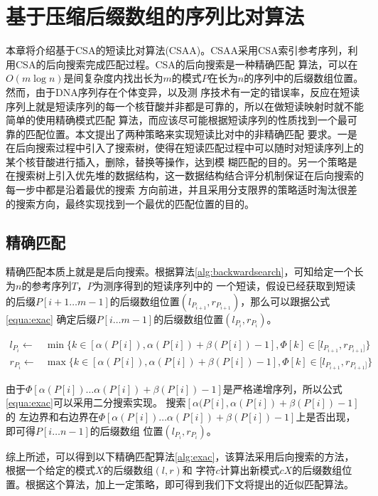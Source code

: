 \chapter{基于压缩后缀数组的序列比对算法}
本章将介绍基于CSA的短读比对算法(CSAA)。CSAA采用CSA索引参考序列，利用CSA的后向搜索完成匹配过程。CSA的后向搜索是一种精确匹配
算法，可以在$O(m\log n)$是间复杂度内找出长为$m$的模式$P$在长为$n$的序列中的后缀数组位置。然而，由于DNA序列存在个体变异，以及测
序技术有一定的错误率，反应在短读序列上就是短读序列的每一个核苷酸并非都是可靠的，所以在做短读映射时就不能简单的使用精确模式匹配
算法，而应该尽可能根据短读序列的性质找到一个最可靠的匹配位置。本文提出了两种策略来实现短读比对中的非精确匹配
要求。一是在后向搜索过程中引入了搜索树，使得在短读匹配过程中可以随时对短读序列上的某个核苷酸进行插入，删除，替换等操作，达到模
糊匹配的目的。另一个策略是在搜索树上引入优先堆的数据结构，这一数据结构结合评分机制保证在后向搜索的每一步中都是沿着最优的搜索
方向前进，并且采用分支限界的策略适时淘汰很差的搜索方向，最终实现找到一个最优的匹配位置的目的。

\section{精确匹配}
精确匹配本质上就是是后向搜索。根据算法\ref{alg:backwardsearch}，可知给定一个长为$n$的参考序列$T$，$P$为测序得到的短读序列中的
一个短读，假设已经获取到短读的后缀$P[i+1\ldots m-1]$的后缀数组位置$(l_{P_{i+1}},r_{P_{i+1}})$，那么可以跟据公式\ref{equa:exac}
确定后缀$P[i\ldots m-1]$的后缀数组位置$(l_{P_i},r_{P_i})$。

\begin{equation}\label{equa:exac}
    \begin{split}
        l_{P_i} \gets &\min\{ k \in [\alpha(P[i]),\alpha(P[i])+\beta(P[i])-1],\Phi[k] \in [l_{P_{i+1}},r_{P_{i+1}]}\}\\
        r_{P_i} \gets &\max\{ k \in [\alpha(P[i]),\alpha(P[i])+\beta(P[i])-1],\Phi[k] \in [l_{P_{i+1}},r_{P_{i+1}]}\}
    \end{split}
\end{equation}

由于$\Phi[\alpha(P[i])\ldots \alpha(P[i])+\beta(P[i])-1]$是严格递增序列，所以公式\ref{equa:exac}可以采用二分搜索实现。
搜索$[\alpha(P[i],\alpha(P[i])+\beta(P[i])-1]$的
左边界和右边界在$\Phi[\alpha(P[i])\ldots \alpha(P[i])+\beta(P[i])-1]$上是否出现，即可得$P[i\ldots n-1]$的后缀数组
位置$(l_{P_i},r_{P_i})$。

综上所述，可以得到以下精确匹配算法\ref{alg:exac}，该算法采用后向搜索的方法，根据一个给定的模式$X$的后缀数组$(l,r)$和
字符$c$计算出新模式$cX$的后缀数组位置。根据这个算法，加上一定策略，即可得到我们下文将提出的近似匹配算法。

